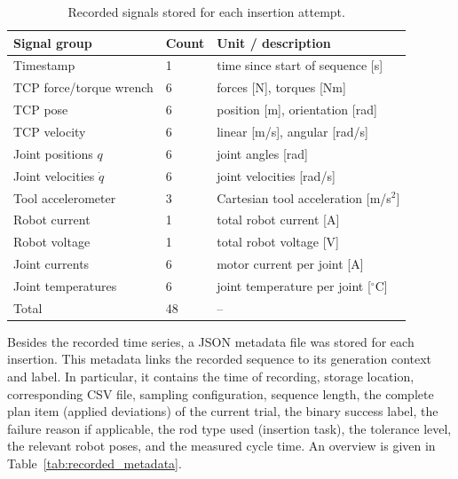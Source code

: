 \begin{table}[htbp]
    \centering
    \caption{Recorded signals stored for each insertion attempt.}
    \label{tab:recorded_signals}
    \begin{tabular}{lll}
        \hline
        Signal group & Count & Unit / description \\
        \hline
        Timestamp & 1 & time since start of sequence [s] \\
        TCP force/torque wrench & 6 & forces [N], torques [Nm] \\
        TCP pose & 6 & position [m], orientation [rad] \\
        TCP velocity & 6 & linear [m/s], angular [rad/s] \\
        Joint positions \(q\) & 6 & joint angles [rad] \\
        Joint velocities \(\dot{q}\) & 6 & joint velocities [rad/s] \\
        Tool accelerometer & 3 & Cartesian tool acceleration [m/s\(^2\)] \\
        Robot current & 1 & total robot current [A] \\
        Robot voltage & 1 & total robot voltage [V] \\
        Joint currents & 6 & motor current per joint [A] \\
        Joint temperatures & 6 & joint temperature per joint [\(^\circ\)C] \\
        \hline
        Total & 48 & -- \\
        \hline
    \end{tabular}
\end{table}


Besides the recorded time series, a JSON metadata file was stored for each insertion. This metadata links the recorded sequence to its generation context and label. In particular, it contains the time of recording, storage location, corresponding CSV file, sampling configuration, sequence length, the complete plan item (applied deviations) of the current trial, the binary success label, the failure reason if applicable, the rod type used (insertion task), the tolerance level, the relevant robot poses, and the measured cycle time. An overview is given in Table~\ref{tab:recorded_metadata}.

